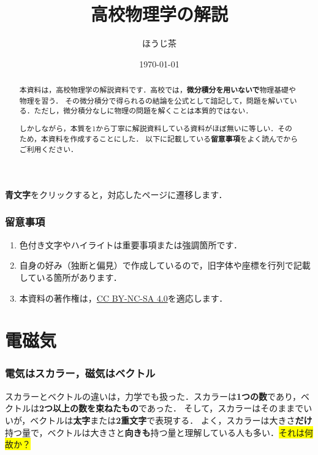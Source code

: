 \documentclass[a4paper,11pt]{ltjsarticle}
\title{高校物理学の解説}
\author{ほうじ茶}
\date{\today}
\begin{document}
\maketitle

\begin{abstract}
  本資料は，高校物理学の解説資料です．高校では，\textbf{微分積分を用いないで}物理基礎や物理を習う．
  その微分積分で得られるの結論を公式として諳記して，問題を解いている．ただし，微分積分なしに物理の問題を解くことは本質的ではない．
  
  しかしながら，本質を1から丁寧に解説資料している資料がほぼ無いに等しい．そのため，本資料を作成することにした．
  以下に記載している\textbf{留意事項}をよく読んでからご利用ください．
\end{abstract}

\tableofcontents

\vspace{12pt}

\begin{center}
  \textbf{\color{blue}青文字}をクリックすると，対応したページに遷移します．
\end{center}

\section*{留意事項}

\begin{enumerate}
  \item 色付き文字やハイライトは重要事項または強調箇所です．
  \item 自身の好み（独断と偏見）で作成しているので，旧字体や座標を行列で記載している箇所があります．
  \item 本資料の著作権は，\href{https://creativecommons.org/licenses/by-nc-sa/4.0}{CC BY-NC-SA 4.0}を適応します．
\end{enumerate}

\clearpage

\part{電磁気}

\section{電気はスカラー，磁気はベクトル}

スカラーとベクトルの違いは，力学でも扱った．スカラーは\textbf{1つの数}であり，ベクトルは\textbf{2つ以上の数を束ねたもの}であった．
そして，スカラーはそのままでいいが，ベクトルは\textbf{太字}または\textbf{2重文字}で表現する．
よく，スカラーは大きさ\textbf{だけ}持つ量で，ベクトルは大きさと\textbf{向きも}持つ量と理解している人も多い．\colorbox{yellow}{それは何故か？}
\end{document}

